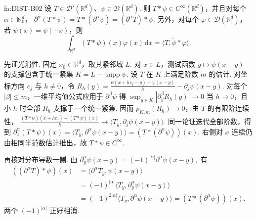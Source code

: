 \begin{FATheorem}[B][分布与测试函数卷积的光滑性及导数换序]{fa:DIST-B02}
设 \(\displaystyle T\in\mathcal D'(\mathbb R^d)\)、\(\displaystyle\psi\in\mathcal D(\mathbb R^d)\). 则 \(\displaystyle T*\psi\in C^\infty(\mathbb R^d)\)，并且对每个 \(\displaystyle\alpha\in\mathbb N_0^d\)， \(\displaystyle \partial^\alpha(T*\psi) = T*(\partial^\alpha\psi) = (\partial^\alpha T)*\psi.\)
另外，对每个 \(\displaystyle\varphi\in\mathcal D(\mathbb R^d)\)，若 \(\displaystyle\check\psi(x)=\psi(-x)\)，则
\[
\int_{\mathbb R^d}(T*\psi)(x)\varphi(x)\,\mathrm{d}x
=
\langle T,\check\psi*\varphi\rangle.
\]
\end{FATheorem}

\begin{FAProof}
先证光滑性. 固定 \(\displaystyle x_0\in\mathbb R^d\)，取其紧邻域 \(\displaystyle L\). 对 \(\displaystyle x\in L\)，测试函数 \(\displaystyle y\mapsto\psi(x-y)\) 的支撑包含于统一紧集 \(\displaystyle K=L-\operatorname{supp}\psi.\)
设 \(\displaystyle T\) 在 \(\displaystyle K\) 上满足阶数 \(\displaystyle m\) 的估计. 对坐标方向 \(\displaystyle e_j\) 与 \(\displaystyle h\neq0\)，令 \(\displaystyle R_h(y) = \frac{\psi(x+he_j-y)-\psi(x-y)}{h}-\partial_j\psi(x-y).\)
对每个 \(\displaystyle|\beta|\leqslant m\)，一维平均值公式应用于 \(\displaystyle\partial^\beta\psi\) 得 \(\displaystyle \sup_{y\in K}|\partial_y^\beta R_h(y)|\longrightarrow0\) 当 \(\displaystyle h\to0\)，且小 \(\displaystyle h\) 时全部 \(\displaystyle R_h\) 支撑于一个统一紧集. 因而 \(\displaystyle p_{K,m}(R_h)\to0\)，由 \(\displaystyle T\) 的有限阶连续性， \(\displaystyle \frac{(T*\psi)(x+he_j)-(T*\psi)(x)}{h} \longrightarrow \langle T_y,\partial_j\psi(x-y)\rangle.\)
同一论证迭代全部阶数，得到 \(\displaystyle \partial_x^\alpha(T*\psi)(x) = \langle T_y,\partial^\alpha\psi(x-y)\rangle = (T*(\partial^\alpha\psi))(x).\)
右侧对 \(\displaystyle x\) 连续仍由相同半范数估计推出，故 \(\displaystyle T*\psi\in C^\infty\).

再核对分布导数一侧. 由 \(\displaystyle \partial_y^\alpha\psi(x-y) = (-1)^{|\alpha|}\partial^\alpha\psi(x-y),\)
有
\[
\begin{aligned}
((\partial^\alpha T)*\psi)(x)
&=\langle\partial^\alpha T_y,\psi(x-y)\rangle\\
&=(-1)^{|\alpha|}\langle T_y,\partial_y^\alpha\psi(x-y)\rangle\\
&=(-1)^{2|\alpha|}\langle T_y,\partial^\alpha\psi(x-y)\rangle
=(T*(\partial^\alpha\psi))(x).
\end{aligned}
\]
两个 \(\displaystyle(-1)^{|\alpha|}\) 正好相消.


\end{FAProof}
